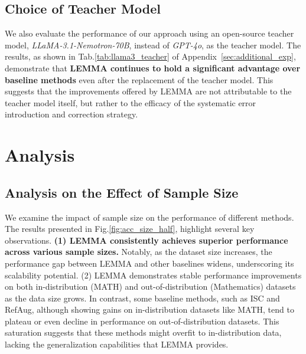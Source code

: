\documentclass[11pt]{article}
\begin{document}
\subsection{Choice of Teacher Model}

We also evaluate the performance of our approach using an open-source teacher model, \textit{LLaMA-3.1-Nemotron-70B}, instead of \textit{GPT-4o}, as the teacher model. The results, as shown in Tab.\ref{tab:llama3_teacher} of Appendix~\ref{sec:additional_exp}, demonstrate that \textbf{LEMMA continues to hold a significant advantage over baseline methods} even after the replacement of the teacher model. This suggests that the improvements offered by LEMMA are not attributable to the teacher model itself, but rather to the efficacy of the systematic error introduction and correction strategy.


\section{Analysis}

\subsection{Analysis on the Effect of Sample Size}


\noindent We examine the impact of sample size on the performance of different methods. The results presented in Fig.\ref{fig:acc_size_half}, highlight several key observations. \textbf{(1) LEMMA consistently achieves superior performance across various sample sizes.} Notably, as the dataset size increases, the performance gap between LEMMA and other baselines widens, underscoring its scalability potential. (2) LEMMA demonstrates stable performance improvements on both in-distribution (MATH) and out-of-distribution (Mathematics) datasets as the data size grows. In contrast, some baseline methods, such as ISC and RefAug, although showing gains on in-distribution datasets like MATH, tend to plateau or even decline in performance on out-of-distribution datasets. This saturation suggests that these methods might overfit to in-distribution data, lacking the generalization capabilities that LEMMA provides.
\end{document}
